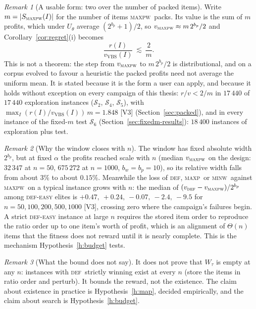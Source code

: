 \documentclass[a4paper,11pt]{article}
\newcommand{\bw}{b_{w}}
\newcommand{\bp}{b_{p}}
\newcommand{\Utheta}{U_{\theta}}
\newcommand{\DEF}{\textsc{def}}
\newcommand{\MAXP}{\textsc{maxp}}
\newcommand{\MAXPW}{\textsc{maxpw}}
\newcommand{\MINW}{\textsc{minw}}
\newcommand{\evid}[1]{\textcolor{inkSoft}{\scriptsize[#1]}}
\theoremstyle{plain}
\theoremstyle{definition}
\theoremstyle{remark}
\newtheorem{remark}{Remark}
\begin{document}
\begin{remark}[A usable form: two over the number of packed items]\label{rem:twoverm}
Write $m=|S_{\MAXPW}(I)|$ for the number of items \MAXPW\ packs. Its value is the sum of $m$
profits, which under $\Utheta$ average $(2^{\bp}+1)/2$, so $v_{\MAXPW}\approx m\,2^{\bp}/2$ and
Corollary~\ref{cor:regret}(i) becomes
\[
\frac{r(I)}{v_{\mathrm{VBS}}(I)}\ \lesssim\ \frac{2}{m}.
\]
This is not a theorem: the step from $v_{\MAXPW}$ to $m\,2^{\bp}/2$ is distributional, and on a
corpus evolved to favour a heuristic the packed profits need not average the uniform mean. It
is stated because it is the form a user can apply, and because it holds without exception on
every campaign of this thesis: $r/v<2/m$ in $17\,440$ of $17\,440$ exploration instances
($\mathcal S_2$, $\mathcal S_4$, $\mathcal S_5$), with
$\max_I (r(I)/v_{\mathrm{VBS}}(I))\,m=1.848$ \evid{V3} (Section~\ref{sec:packed}), and in
every instance of the fixed-$m$ test $\mathcal S_6$ (Section~\ref{sec:fixedm-results}):
$18\,400$ instances of exploration plus test.
\end{remark}

\begin{remark}[Why the window closes with $n$]\label{rem:window}
The window has fixed absolute width $2^{\bp}$, but at fixed $\alpha$ the profits reached
scale with $n$ (median $v_{\MAXPW}$ on the design: $32\,347$ at $n=50$, $675\,272$ at
$n=1000$, $\bw=\bp=10$), so its relative width falls from about $3\%$ to about $0.15\%$.
Meanwhile the loss of \DEF, \MAXP\ or \MINW\ against \MAXPW\ on a typical instance grows with
$n$: the median of $(v_{\DEF}-v_{\MAXPW})/2^{\bp}$ among \DEF-\textsc{easy} elites is
$+0.47,\ +0.24,\ -0.07,\ -2.4,\ -9.5$ for $n=50,100,200,500,1000$ \evid{V3}, crossing zero
where the campaign's failures begin. A strict \DEF-\textsc{easy} instance at large $n$
requires the stored item order to reproduce the ratio order up to one item's worth of
profit, which is an alignment of $\Theta(n)$ items that the fitness does not reward until
it is nearly complete. This is the mechanism Hypothesis~\ref{h:budget} tests.
\end{remark}

\begin{remark}[What the bound does not say]\label{rem:nobound}
It does not prove that $W_\tau$ is empty at any $n$: instances with \DEF\ strictly winning
exist at every $n$ (store the items in ratio order and perturb). It bounds the reward, not
the existence. The claim about existence in practice is Hypothesis~\ref{h:map}, decided
empirically, and the claim about search is Hypothesis~\ref{h:budget}.
\end{remark}
\end{document}
